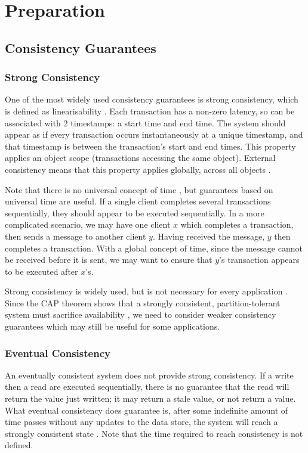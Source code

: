 \documentclass[12pt,a4paper,twoside,openany]{report}
\begin{document}
\chapter{Preparation}

\section{Consistency Guarantees}

\subsection*{Strong Consistency}

One of the most widely used consistency guarantees is strong consistency, which is defined as linearisability \cite{herlihy1990linearizability}. Each transaction has a non-zero latency, so can be associated with 2 timestamps: a start time and end time. The system should appear as if every transaction occurs instantaneously at a unique timestamp, and that timestamp is between the transaction's start and end times. This property applies an object scope (transactions accessing the same object). External consistency means that this property applies globally, across all objects \cite{45855}.

Note that there is no universal concept of time \cite{bacon2003operating}, but guarantees based on universal time are useful. If a single client completes several transactions sequentially, they should appear to be executed sequentially. In a more complicated scenario, we may have one client $x$ which completes a transaction, then sends a message to another client $y$. Having received the message, $y$ then completes a transaction. With a global concept of time, since the message cannot be received before it is sent, we may want to ensure that $y$'s transaction appears to be executed after $x$'s.

Strong consistency is widely used, but is not necessary for every application \cite{vogels_2008}. Since the CAP theorem shows that a strongly consistent, partition-tolerant system must sacrifice availability \cite{gilbert}, we need to consider weaker consistency guarantees which may still be useful for some applications.

\subsection*{Eventual Consistency}

An eventually consistent system does not provide strong consistency. If a write then a read are executed sequentially, there is no guarantee that the read will return the value just written; it may return a stale value, or not return a value. What eventual consistency does guarantee is, after some indefinite amount of time passes without any updates to the data store, the system will reach a strongly consistent state \cite{vogels_2008}. Note that the time required to reach consistency is not defined.
\end{document}

